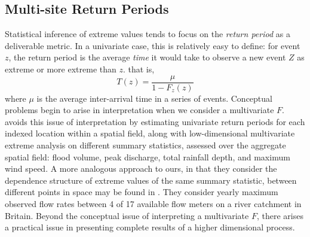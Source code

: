 \subsection{Multi-site Return Periods}
Statistical inference of extreme values tends to focus on the \emph{return period} as a deliverable
    metric.  In a univariate case, this is relatively easy to define: for event $z$, the return period
    is the average \emph{time} it would take to observe a new event $Z$ as extreme or more extreme than $z$.
    that is,
    \[
    T(z) = \frac{\mu}{1 - F_z(z)}
    \]
    where $\mu$ is the average inter-arrival time in a series of events. Conceptual problems begin to arise
    in interpretation when we consider a multivariate $F$. 
    \cite{cho2023} avoids this issue of interpretation by estimating univariate return periods for each
    indexed location within a spatial field, along with low-dimensional multivariate extreme analysis 
    on different summary statistics, assessed over the aggregate spatial field: flood volume, 
    peak discharge, total rainfall depth, and maximum wind speed.
    A more analogous approach to ours, in that they consider the dependence structure of extreme values of 
    the same summary statistic, between different points in space may be found in \cite{salvadori2010}.  They
    consider yearly maximum observed flow rates between 4 of 17 available flow meters on a river catchment
    in Britain. 
    Beyond the conceptual issue of interpreting a multivariate $F$, there arises a practical issue in presenting
    complete results of a higher dimensional process.
       
